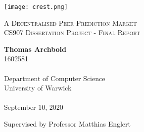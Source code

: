 \documentclass[10pt,a4paper]{article}
\theoremstyle{plain}
\theoremstyle{definition}
\begin{document}
\begin{titlepage}
    \begin{center}

        \vspace*{2cm}
        \texttt{[image: crest.png]}

        \vspace*{1cm}
		{\Large \textsc{A Decentralised Peer-Prediction Market}} \\
		{\textsc{CS907 Dissertation Project - Final Report}}

        \vspace*{1cm}
        \textbf{Thomas Archbold} \\
		1602581 \\~\\
        Department of Computer Science \\
        University of Warwick \\~\\

		September 10, 2020

		\vspace*{1cm}

		Supervised by Professor Matthias Englert

        \vfill

    \end{center}
\end{titlepage}

% 
%

\end{document}
